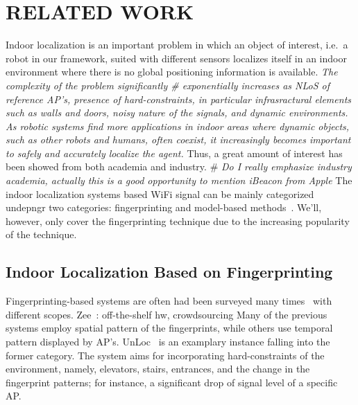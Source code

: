 \documentclass[letterpaper, 10 pt, conference]{ieeeconf}  %
\newcommand{\lorem}{
}
\begin{document}
%
%
%
\section{\label{sec-RW}RELATED WORK}
  Indoor localization is an important problem in which an object of interest, i.e.\ a robot in our framework, suited with different sensors localizes itself in an indoor environment where there is no global positioning information is available.
  \textit{The complexity of the problem significantly \# \textit{exponentially} increases as NLoS of reference AP's, presence of hard-constraints, in particular infrasractural elements such as walls and doors, noisy nature of the signals, and dynamic environments.}~\cite{liu2007survey}
  \textit{As robotic systems find more applications in indoor areas where dynamic objects, such as other robots and humans, often coexist, it increasingly becomes important to safely and accurately localize the agent.} %
  Thus, a great amount of interest has been showed from both academia and industry.
  \# \textit{Do I really emphasize industry academia, actually this is a good opportunity to mention iBeacon from Apple}
  The indoor localization systems based WiFi signal can be mainly categorized undepngr two categories: fingerprinting and model-based methods~\cite{hossain2015survey}.
  We'll, however, only cover the fingerprinting technique due to the increasing popularity of the technique.

  \subsection{Indoor Localization Based on Fingerprinting}
    Fingerprinting-based systems are often   had been surveyed many times~\cite{he2016wi} with different scopes.
    Zee~\cite{rai2012zee}: off-the-shelf hw, crowdsourcing
    Many of the previous systems employ spatial pattern of the fingerprints, while others use temporal pattern displayed by AP's.
    UnLoc~\cite{wang2012no} is an examplary instance falling into the former category.
    The system aims for incorporating hard-constraints of the environment, namely, elevators, stairs, entrances, and the change in the fingerprint patterns; for instance, a significant drop of signal level of a specific AP\@.
\end{document}

